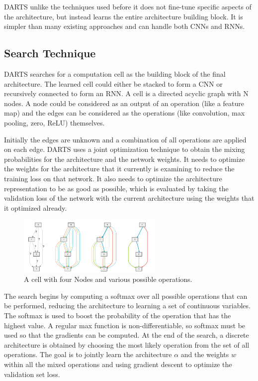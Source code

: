 \documentclass{ieee}
\begin{document}
DARTS unlike the techniques used before it does not fine-tune specific aspects of the architecture, but instead learns the entire architecture building block.  It is simpler than many existing approaches and can handle both CNNs and RNNs.

\subsection{Search Technique}
DARTS searches for a computation cell as the building block of the final architecture. The learned cell could either be stacked to form a CNN or recursively connected to form an RNN. A cell is a directed acyclic graph with N nodes. A node could be considered as an output of an operation (like a feature map) and the edges can be considered as the operations (like convolution, max pooling, zero, ReLU) themselves. 

Initially the edges are unknown and a combination of all operations are applied on each edge. DARTS uses a joint optimization technique to obtain the mixing probabilities for the architecture and the network weights. It needs to optimize the weights for the architecture that it currently is examining to reduce the training loss on that network. It also needs to optimize the architecture representation to be as good as possible, which is evaluated by taking the validation loss of the network with the current architecture using the weights that it optimized already. 
 \begin{figure}[h]
    \begin{center}
    \includegraphics[width=7cm]{images/DARTS.png}
    \end{center}
    \label{mbconv_fig}
    \caption{A cell with four Nodes and various possible operations. \cite{DARTSMODEL}}
\end{figure}

The search begins by computing a softmax over all possible operations that can be performed, reducing the architecture to learning a set of continuous variables. The softmax is used to boost the probability of the operation that has the highest value. A regular max function is non-differentiable, so softmax must be used so that the gradients can be computed. At the end of the search, a discrete architecture is obtained by choosing the most likely operation from the set of all operations. The goal is to jointly learn the architecture $\alpha$ and the weights $w$ within all the mixed operations and using gradient descent to optimize the validation set loss.
\end{document}
